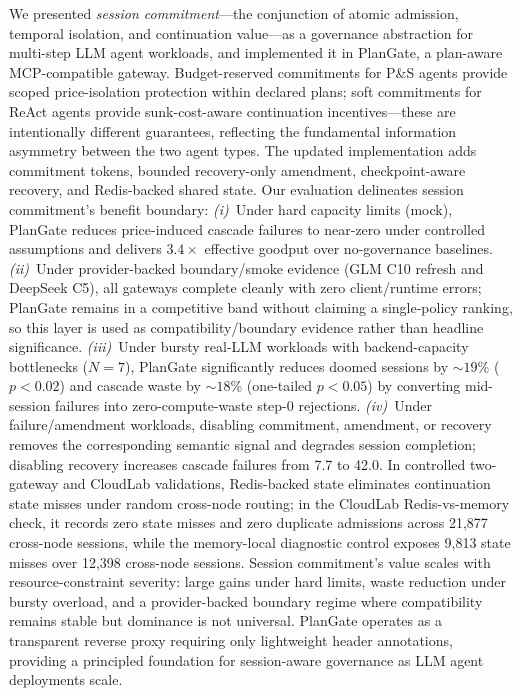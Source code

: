 \documentclass[sigconf,review,anonymous]{acmart}
\begin{document}
We presented \emph{session commitment}---the conjunction of atomic admission, temporal isolation, and continuation value---as a governance abstraction for multi-step LLM agent workloads, and implemented it in PlanGate, a plan-aware MCP-compatible gateway. Budget-reserved commitments for P\&S agents provide scoped price-isolation protection within declared plans; soft commitments for ReAct agents provide sunk-cost-aware continuation incentives---these are intentionally different guarantees, reflecting the fundamental information asymmetry between the two agent types. The updated implementation adds commitment tokens, bounded recovery-only amendment, checkpoint-aware recovery, and Redis-backed shared state. Our evaluation delineates session commitment's benefit boundary:
\emph{(i)}~Under hard capacity limits (mock), PlanGate reduces price-induced cascade failures to near-zero under controlled assumptions and delivers $3.4\times$ effective goodput over no-governance baselines.
\emph{(ii)}~Under provider-backed boundary/smoke evidence (GLM C10 refresh and DeepSeek C5), all gateways complete cleanly with zero client/runtime errors; PlanGate remains in a competitive band without claiming a single-policy ranking, so this layer is used as compatibility/boundary evidence rather than headline significance.
\emph{(iii)}~Under bursty real-LLM workloads with backend-capacity bottlenecks ($N{=}7$), PlanGate significantly reduces doomed sessions by ${\sim}19$\% ($p{<}0.02$) and cascade waste by ${\sim}18$\% (one-tailed $p{<}0.05$) by converting mid-session failures into zero-compute-waste step-0 rejections.
\emph{(iv)}~Under failure/amendment workloads, disabling commitment, amendment, or recovery removes the corresponding semantic signal and degrades session completion; disabling recovery increases cascade failures from 7.7 to 42.0.
In controlled two-gateway and CloudLab validations, Redis-backed state eliminates continuation state misses under random cross-node routing; in the CloudLab Redis-vs-memory check, it records zero state misses and zero duplicate admissions across 21,877 cross-node sessions, while the memory-local diagnostic control exposes 9,813 state misses over 12,398 cross-node sessions. Session commitment's value scales with resource-constraint severity: large gains under hard limits, waste reduction under bursty overload, and a provider-backed boundary regime where compatibility remains stable but dominance is not universal. PlanGate operates as a transparent reverse proxy requiring only lightweight header annotations, providing a principled foundation for session-aware governance as LLM agent deployments scale.
\end{document}
